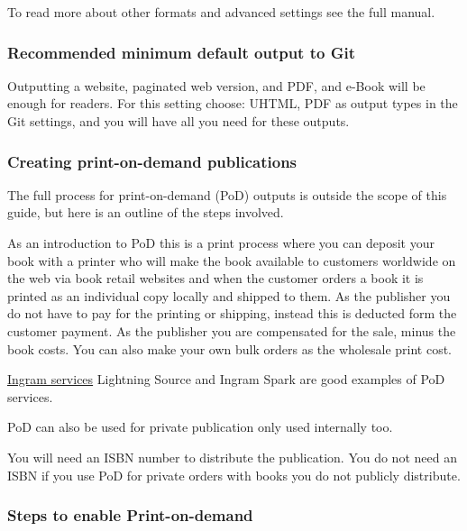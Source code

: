 \documentclass{article}
\begin{document}
To read more about other formats and advanced settings see the full manual.


\subsubsection{Recommended minimum default output to Git}\label{H2167774}



Outputting a website, paginated web version, and PDF, and e-Book will be enough for readers. For this setting choose: UHTML, PDF as output types in the Git settings, and you will have all you need for these outputs.


\subsubsection{Creating print-on-demand publications}\label{H6991098}



The full process for print-on-demand (PoD) outputs is outside the scope of this guide, but here is an outline of the steps involved.


As an introduction to PoD this is a print process where you can deposit your book with a printer who will make the book available to customers worldwide on the web via book retail websites and when the customer orders a book it is printed as an individual copy locally and shipped to them. As the publisher you do not have to pay for the printing or shipping, instead this is deducted form the customer payment. As the publisher you are compensated for the sale, minus the book costs. You can also make your own bulk orders as the wholesale print cost.


\href{https://www.ingramcontent.com/publishers/print-on-demand}{Ingram services} Lightning Source and Ingram Spark are good examples of PoD services.


PoD can also be used for private publication only used internally too.


You will need an ISBN number to distribute the publication. You do not need an ISBN if you use PoD for private orders with books you do not publicly distribute.


\subsubsection{Steps to enable Print-on-demand}\label{H855085}
\end{document}
